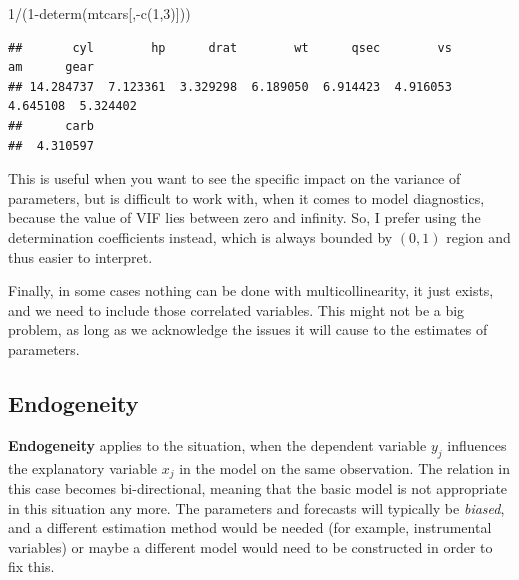 \documentclass[
]{book}
\newenvironment{Shaded}{\begin{snugshade}}{\end{snugshade}}
\newcommand{\DecValTok}[1]{\textcolor[rgb]{0.00,0.00,0.81}{#1}}
\newcommand{\FunctionTok}[1]{\textcolor[rgb]{0.00,0.00,0.00}{#1}}
\newcommand{\NormalTok}[1]{#1}
\newcommand{\SpecialCharTok}[1]{\textcolor[rgb]{0.00,0.00,0.00}{#1}}
\theoremstyle{definition}
\theoremstyle{definition}
\theoremstyle{definition}
\theoremstyle{definition}
\theoremstyle{remark}
\begin{document}
\begin{Shaded}
\begin{Highlighting}[]
\DecValTok{1}\SpecialCharTok{/}\NormalTok{(}\DecValTok{1}\SpecialCharTok{{-}}\FunctionTok{determ}\NormalTok{(mtcars[,}\SpecialCharTok{{-}}\FunctionTok{c}\NormalTok{(}\DecValTok{1}\NormalTok{,}\DecValTok{3}\NormalTok{)]))}
\end{Highlighting}
\end{Shaded}

\begin{verbatim}
##       cyl        hp      drat        wt      qsec        vs        am      gear 
## 14.284737  7.123361  3.329298  6.189050  6.914423  4.916053  4.645108  5.324402 
##      carb 
##  4.310597
\end{verbatim}

This is useful when you want to see the specific impact on the variance of parameters, but is difficult to work with, when it comes to model diagnostics, because the value of VIF lies between zero and infinity. So, I prefer using the determination coefficients instead, which is always bounded by \((0, 1)\) region and thus easier to interpret.

Finally, in some cases nothing can be done with multicollinearity, it just exists, and we need to include those correlated variables. This might not be a big problem, as long as we acknowledge the issues it will cause to the estimates of parameters.

\hypertarget{assumptionsXregEndogeneity}{%
\subsection{Endogeneity}\label{assumptionsXregEndogeneity}}

\textbf{Endogeneity} applies to the situation, when the dependent variable \(y_j\) influences the explanatory variable \(x_j\) in the model on the same observation. The relation in this case becomes bi-directional, meaning that the basic model is not appropriate in this situation any more. The parameters and forecasts will typically be \emph{biased}, and a different estimation method would be needed (for example, instrumental variables) or maybe a different model would need to be constructed in order to fix this.
\end{document}
